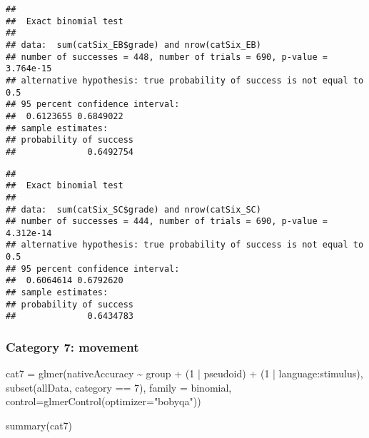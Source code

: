 \documentclass[
]{article}
\newenvironment{Shaded}{\begin{snugshade}}{\end{snugshade}}
\newcommand{\AttributeTok}[1]{\textcolor[rgb]{0.77,0.63,0.00}{#1}}
\newcommand{\DecValTok}[1]{\textcolor[rgb]{0.00,0.00,0.81}{#1}}
\newcommand{\FunctionTok}[1]{\textcolor[rgb]{0.00,0.00,0.00}{#1}}
\newcommand{\NormalTok}[1]{#1}
\newcommand{\OtherTok}[1]{\textcolor[rgb]{0.56,0.35,0.01}{#1}}
\newcommand{\SpecialCharTok}[1]{\textcolor[rgb]{0.00,0.00,0.00}{#1}}
\newcommand{\StringTok}[1]{\textcolor[rgb]{0.31,0.60,0.02}{#1}}
\begin{document}
\begin{verbatim}
## 
##  Exact binomial test
## 
## data:  sum(catSix_EB$grade) and nrow(catSix_EB)
## number of successes = 448, number of trials = 690, p-value = 3.764e-15
## alternative hypothesis: true probability of success is not equal to 0.5
## 95 percent confidence interval:
##  0.6123655 0.6849022
## sample estimates:
## probability of success 
##              0.6492754
\end{verbatim}

\begin{Shaded}
\end{Shaded}

\begin{verbatim}
## 
##  Exact binomial test
## 
## data:  sum(catSix_SC$grade) and nrow(catSix_SC)
## number of successes = 444, number of trials = 690, p-value = 4.312e-14
## alternative hypothesis: true probability of success is not equal to 0.5
## 95 percent confidence interval:
##  0.6064614 0.6792620
## sample estimates:
## probability of success 
##              0.6434783
\end{verbatim}

\hypertarget{category-7-movement}{%
\subsubsection{Category 7: movement}\label{category-7-movement}}

\begin{Shaded}
\begin{Highlighting}[]
\NormalTok{cat7 }\OtherTok{=} \FunctionTok{glmer}\NormalTok{(nativeAccuracy }\SpecialCharTok{\textasciitilde{}}\NormalTok{ group }\SpecialCharTok{+}
\NormalTok{        (}\DecValTok{1} \SpecialCharTok{|}\NormalTok{ pseudoid) }\SpecialCharTok{+}\NormalTok{ (}\DecValTok{1} \SpecialCharTok{|}\NormalTok{ language}\SpecialCharTok{:}\NormalTok{stimulus),}
      \FunctionTok{subset}\NormalTok{(allData, category }\SpecialCharTok{==} \DecValTok{7}\NormalTok{),}
      \AttributeTok{family =}\NormalTok{ binomial,}
      \AttributeTok{control=}\FunctionTok{glmerControl}\NormalTok{(}\AttributeTok{optimizer=}\StringTok{"bobyqa"}\NormalTok{))}

\FunctionTok{summary}\NormalTok{(cat7)}
\end{Highlighting}
\end{Shaded}
\end{document}
